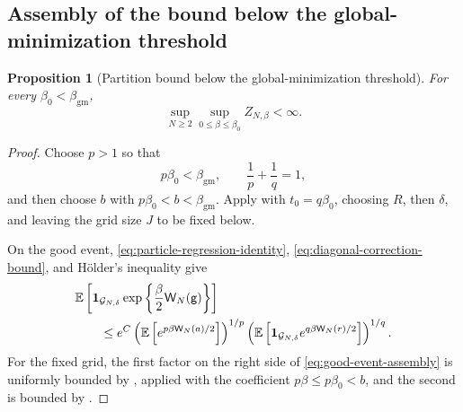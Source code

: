 \documentclass[11pt,reqno]{amsart}
\numberwithin{equation}{section}
\theoremstyle{plain}
\newtheorem{prop}[prop]{Proposition}
\theoremstyle{definition}
\newcommand{\E}{\mathbb E}
\newcommand{\one}{\mathbf 1}
\newcommand{\be}{\beta}
\newcommand{\g}{\mathsf g}
\newcommand{\gm}{\mathrm{gm}}
\begin{document}
\subsection{Assembly of the bound below the global-minimization threshold}
\label{subsec:order-one-assembly}

\begin{prop}[Partition bound below the global-minimization threshold]
\label{prop:compact-subcritical-partition-bound}
For every $\be_0<\beta_{\gm}$,
\begin{equation}
 \sup_{N\geq2}\sup_{0\leq\be\leq\be_0}
 Z_{N,\be}<\infty.
 \label{eq:compact-subcritical-partition-bound}
\end{equation}
\end{prop}

\begin{proof}
Choose $p>1$ so that
\begin{equation}
 p\be_0<\beta_{\gm},
 \qquad
 \frac1p+\frac1q=1,
 \label{eq:good-holder-exponents}
\end{equation}
and then choose $b$ with $p\be_0<b<\beta_{\gm}$.  Apply  with $t_0=q\be_0$, choosing $R$, then $\delta$, and leaving the grid size $J$ to be fixed below.

On the good event, \eqref{eq:particle-regression-identity}, \eqref{eq:diagonal-correction-bound}, and H\"older's inequality give
\begin{align}
 &\E\left[\one_{\mathcal G_{N,\delta}}
 \exp\left\{\frac\be2\mathsf W_N(\g)\right\}\right]
 \notag\\
 &\qquad\leq e^{C}
 \left(\E\left[e^{p\be\mathsf W_N(a)/2}\right]\right)^{1/p}
 \left(\E\left[\one_{\mathcal G_{N,\delta}}
 e^{q\be\mathsf W_N(r)/2}\right]\right)^{1/q}.
 \label{eq:good-event-assembly}
\end{align}
For the fixed grid, the first factor on the right side of \eqref{eq:good-event-assembly} is uniformly bounded by , applied with the coefficient $p\be\leq p\be_0<b$, and the second is bounded by .


\end{proof}
\end{document}
